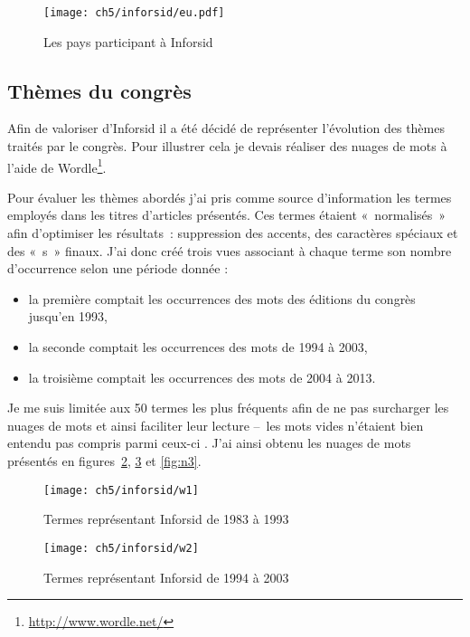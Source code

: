 			\begin{figure}[h]
				\centering
				\texttt{[image: ch5/inforsid/eu.pdf]}
				\caption{Les pays participant à Inforsid}\label{fig:eu}
			\end{figure}
			
			
		\subsection{Thèmes du congrès}
			Afin de valoriser d\rq{}Inforsid il a été décidé de représenter l\rq{}évolution des thèmes traités par le congrès. Pour illustrer cela je devais réaliser des nuages de mots à l\rq{}aide de Wordle\footnote{\url{http://www.wordle.net/}}.
			
			Pour évaluer les thèmes abordés j\rq{}ai pris comme source d\rq{}information les termes employés dans les titres d\rq{}articles présentés. Ces termes étaient «~normalisés~» afin d'optimiser les résultats~: suppression des accents, des caractères spéciaux et des «~s~» finaux. J\rq{}ai donc créé trois vues associant à chaque terme son nombre d\rq{}occurrence selon une période donnée :
			\begin{itemize}
				\item la première comptait les occurrences des mots des éditions du congrès jusqu\rq{}en 1993,
				\item la seconde comptait les occurrences des mots de 1994 à 2003,
				\item la troisième comptait les occurrences des mots de 2004 à 2013.
			\end{itemize}
			
			Je me suis limitée aux 50 termes les plus fréquents afin de ne pas surcharger les nuages de mots et ainsi faciliter leur lecture --~les mots vides n'étaient bien entendu pas compris parmi ceux-ci . J'ai ainsi obtenu les nuages de mots présentés en figures~\ref{fig:n1}, \ref{fig:n2} et \ref{fig:n3}.
			
			\begin{figure}[p]
				\centering
				\texttt{[image: ch5/inforsid/w1]}
				\caption{Termes représentant Inforsid de 1983 à 1993}\label{fig:n1}
			\end{figure}
			
			\begin{figure}[p]
				\centering
				\texttt{[image: ch5/inforsid/w2]}
				\caption{Termes représentant Inforsid de 1994 à 2003}\label{fig:n2}
			\end{figure}
			
